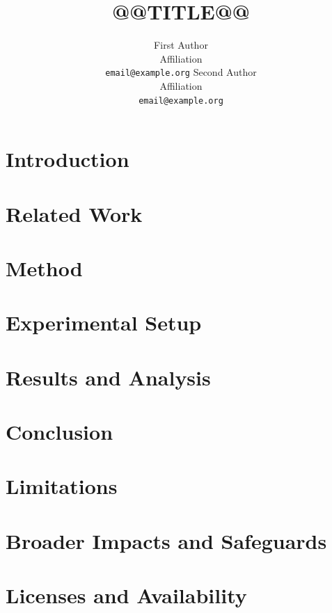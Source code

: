 \documentclass{article}
\title{@@TITLE@@}
\author{First Author \\ Affiliation \\ \texttt{email@example.org}
  \And Second Author \\ Affiliation \\ \texttt{email@example.org}}
\begin{document}
\maketitle

\begin{abstract}

\end{abstract}

\section{Introduction}\label{sec:intro}


\section{Related Work}\label{sec:related}


\section{Method}\label{sec:method}


\section{Experimental Setup}\label{sec:setup}


\section{Results and Analysis}\label{sec:results}


\section{Conclusion}\label{sec:conclusion}


\section*{Limitations}


\section*{Broader Impacts and Safeguards}


\section*{Licenses and Availability}

\end{document}
